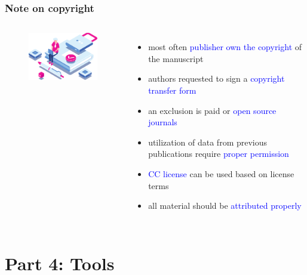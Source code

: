 \documentclass[newPxFont,sthlmFooter]{beamer}
\newcommand{\fs}{\footnotesize}
\begin{document}
\begin{frame}\frametitle{Note on copyright}
  \begin{columns}[T,onlytextwidth]
    \vspace{1cm}
  \begin{figure}
    \centering
    \includegraphics[width=2in]{figs/cc} 
  \end{figure}
\begin{itemize}
  \fs
  \item most often \textcolor{blue}{publisher own the copyright} of the manuscript
  \item authors requested to sign a \textcolor{blue}{copyright transfer form}
  \item an exclusion is paid or \textcolor{blue}{open source journals}
  \item utilization of data from previous publications require \textcolor{blue}{proper permission}
  \item \textcolor{blue}{CC license} can be used based on license terms
  \item all material should be \textcolor{blue}{attributed properly}
  \end{itemize}
  \end{columns}
\end{frame}

\section{Part 4: Tools}
\end{document}

